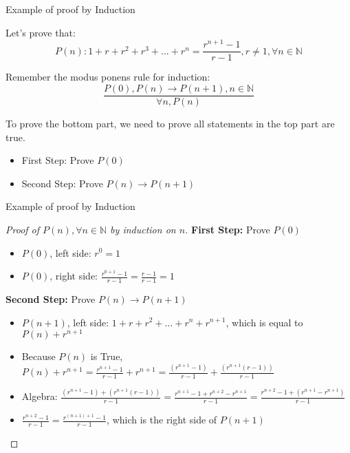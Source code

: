 \begin{frame}{Example of proof by Induction}

  Let's prove that:
  \begin{equation*}
    P(n): 1 + r + r^2 + r^3 + \ldots + r^n = \frac{r^{n+1}-1}{r-1}, r \neq 1, \forall n \in \mathbb{N}
  \end{equation*}\bigskip

  Remember the modus ponens rule for induction:
  \begin{equation*}
    \frac{P(0), P(n)\rightarrow P(n+1), n\in\mathbb{N}}{\forall n, P(n)}
  \end{equation*}\bigskip

  To prove the bottom part, we need to prove all statements in the top part are true.

  \begin{itemize}
  \item First Step: Prove $P(0)$
  \item Second Step: Prove $P(n) \rightarrow P(n+1)$
  \end{itemize}
\end{frame}

\begin{frame}{Example of proof by Induction}

  \begin{proof}[Proof of $P(n), \forall n \in \mathbb{N}$ by induction on $n$]
    {\bf First Step:} Prove $P(0)$
    \begin{itemize}
    \item $P(0)$, left side: $r^0 = 1$
    \item $P(0)$, right side: $\frac{r^{0+1}-1}{r-1} = \frac{r-1}{r-1} = 1$
    \end{itemize}\medskip

    {\bf Second Step:} Prove $P(n) \rightarrow P(n+1)$
    \begin{itemize}
    \item $P(n+1)$, left side: $1 + r + r^2 + \ldots + r^n + r^{n+1}$, which is equal to $P(n)+r^{n+1}$
    \item Because $P(n)$ is True, $P(n)+r^{n+1} = \frac{r^{n+1}-1}{r-1} + r^{n+1} = \frac{(r^{n+1}-1)}{r-1} + \frac{(r^{n+1}(r-1))}{r-1}$
    \item Algebra: $\frac{(r^{n+1}-1) + (r^{n+1}(r-1))}{r-1} = \frac{r^{n+1} - 1 + r^{n+2} - r^{n+1}}{r-1} = \frac{r^{n+2} - 1 + (r^{n+1} - r^{n+1})}{r-1}$
    \item $\frac{r^{n+2} - 1}{r-1} = \frac{r^{(n+1)+1} - 1}{r-1}$, which is the right side of $P(n+1)$
    \end{itemize}
  \end{proof}
\end{frame}

